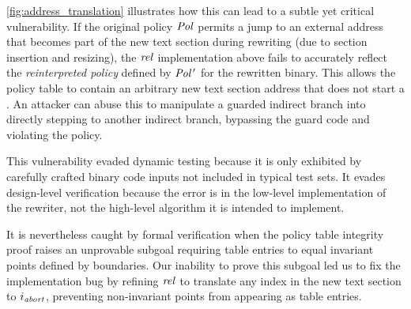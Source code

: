 \autoref{fig:address_translation} illustrates how this can lead to a subtle yet critical vulnerability.
If the original policy $\mathit{Pol}$ permits a jump to an external address that becomes part of the new text section during rewriting (due to section insertion and resizing), the $\mathit{rel}$ implementation above fails to accurately reflect the \emph{reinterpreted policy} defined by $\mathit{Pol}\kern1pt'$ for the rewritten binary.
This allows the policy table to contain an arbitrary new text section address that does not start a \Block.
An attacker can abuse this to manipulate a guarded indirect branch into directly stepping to another indirect branch, bypassing the guard code and violating the policy.

This vulnerability evaded dynamic testing because it is only exhibited by carefully crafted binary code inputs not included in typical test sets.
It evades design-level verification because the error is in the low-level implementation of the rewriter, not the high-level algorithm it is intended to implement.

It is nevertheless caught by formal verification when the policy table integrity proof raises an unprovable subgoal requiring table entries to equal invariant points defined by \Block boundaries.
Our inability to prove this subgoal led us to fix the implementation bug by refining $\mathit{rel}$ to translate any index in the new text section to $i_\mathit{abort}$, preventing non-invariant points from appearing as table entries.


